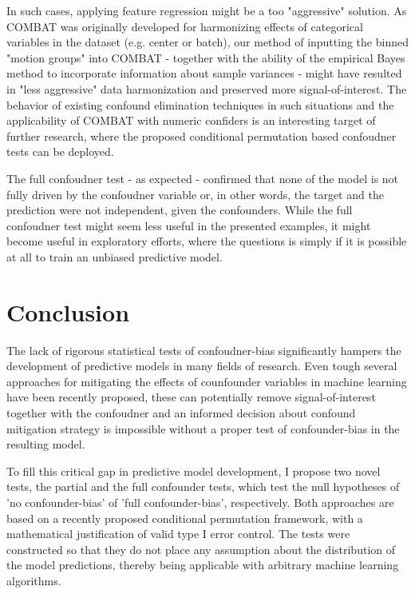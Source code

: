 \documentclass{article}
\begin{document}
In such cases, applying feature regression might be a too "aggressive" solution. As COMBAT was originally developed for harmonizing effects of categorical variables in the dataset (e.g. center or batch), our method of inputting the binned "motion groups" into COMBAT - together with the ability of the empirical Bayes method to incorporate information about sample variances - might have resulted in "less aggressive" data harmonization and preserved more signal-of-interest. 
The behavior of existing confound elimination techniques in such situations and the applicability of COMBAT with numeric confiders is an interesting target of further research, where the proposed conditional permutation based confoudner tests can be deployed.

The full confoudner test - as expected - confirmed that none of the model is not fully driven by the confoudner variable or, in other words, the target and the prediction were not independent, given the confounders. While the full confoudner test might seem less useful in the presented examples, it might become useful in exploratory efforts, where the questions is simply if it is possible at all to train an unbiased predictive model.

\section{Conclusion}

The lack of rigorous statistical tests of confoudner-bias significantly hampers the development of predictive models in many fields of research. Even tough several approaches for mitigating the effects of counfounder variables in machine learning have been recently proposed, these can potentially remove signal-of-interest together with the confoudner and an informed decision about confound mitigation strategy is impossible without a proper test of confounder-bias in the resulting model.

To fill this critical gap in predictive model development, I propose two novel tests, the partial and the full confounder tests, which test the null hypotheses of 'no confounder-bias' of 'full confounder-bias', respectively. Both approaches are based on a recently proposed conditional permutation framework, with a mathematical justification of valid type I error control. The tests were constructed so that they do not place any assumption about the distribution of the model predictions, thereby being applicable with arbitrary machine learning algorithms.
\end{document}
